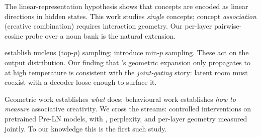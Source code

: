 The linear-representation hypothesis
\citep{marks2023geometry,park2024linear,geva2022transformer,belrose2023eliciting}
shows that concepts are encoded as linear directions in hidden states.
This work studies \emph{single} concepts; concept \emph{association}
(creative combination) requires interaction geometry. Our per-layer
pairwise-cosine probe over a noun bank is the natural extension.

\citet{holtzman2020curious} establish nucleus (top-$p$) sampling;
\citet{nguyen2025minp} introduce min-$p$ sampling. These act on the output
distribution. Our finding that \layernorm's geometric expansion only
propagates to \dat at high temperature is consistent with the
\emph{joint-gating} story: latent room must coexist with a decoder loose
enough to surface it.

Geometric work establishes \emph{what} \layernorm does; behavioural work
establishes \emph{how to measure} associative creativity. We cross the
streams: controlled \layernorm interventions on pretrained Pre-LN models,
with \dat, perplexity, and per-layer geometry measured jointly. To our
knowledge this is the first such study.
